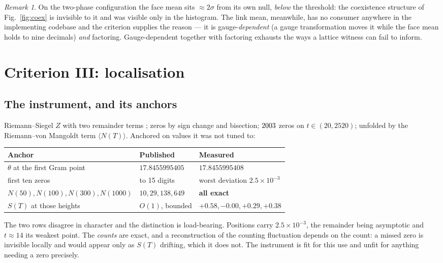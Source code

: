 \documentclass[11pt]{article}
\theoremstyle{remark}
\newtheorem{remark}{Remark}
\begin{document}
\begin{remark}
On the two-phase configuration the face mean sits $\approx2\sigma$ from its own null,
\emph{below} the threshold: the coexistence structure of Fig.~\ref{fig:coex} is
invisible to it and was visible only in the histogram. The link mean, meanwhile, has no
consumer anywhere in the implementing codebase and the criterion supplies the reason ---
it is gauge-\emph{dependent} (a gauge transformation moves it while the face mean holds
to nine decimals) \emph{and} factoring. Gauge-dependent together with factoring exhausts
the ways a lattice witness can fail to inform.
\end{remark}

\section{Criterion III: localisation}\label{sec:gibbs}

\subsection{The instrument, and its anchors}

Riemann--Siegel $Z$ with two remainder terms \cite{edwards}; zeros by sign change and
bisection; $2003$ zeros on $t\in(20,2520)$; unfolded by the Riemann--von Mangoldt
term $\langle N(T)\rangle$. Anchored on values it was not tuned to:

\begin{center}\small
\begin{tabular}{lll}
\toprule
Anchor & Published & Measured \\
\midrule
$\theta$ at the first Gram point & $17.8455995405$ & $17.8455995408$ \\
first ten zeros & to 15 digits & worst deviation $2.5\times10^{-3}$ \\
$N(50),N(100),N(300),N(1000)$ & $10,29,138,649$ & \textbf{all exact} \\
$S(T)$ at those heights & $O(1)$, bounded & $+0.58,-0.00,+0.29,+0.38$ \\
\bottomrule
\end{tabular}
\end{center}

The two rows disagree in character and the distinction is load-bearing. Positions carry
$2.5\times10^{-3}$, the remainder being asymptotic and $t\approx14$ its weakest point.
The \emph{counts} are exact, and a reconstruction of the counting fluctuation depends on
the count: a missed zero is invisible locally and would appear only as $S(T)$ drifting,
which it does not. The instrument is fit for this use and unfit for anything needing a
zero precisely.
\end{document}
